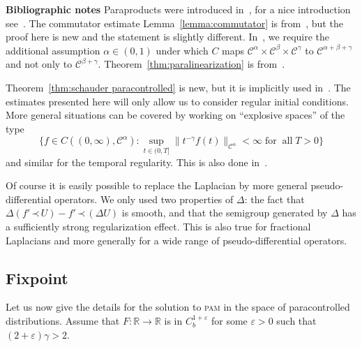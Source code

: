 \documentclass[a4paper,11pt]{article}
\newcommand{\tmname}[1]{\textsc{#1}}
\newcommand{\tmop}[1]{\ensuremath{\operatorname{#1}}}
\newcommand{\tmtextbf}[1]{{\bfseries{#1}}}
\newcommand{\CC}{\mathscr{C}}
\newcommand{\lpara}{\,\mathord{\prec}\,}
\begin{document}
\tmtextbf{Bibliographic notes} Paraproducts were introduced
in~{\cite{Bony1981}}, for a nice introduction see~{\cite{Bahouri2011}}. The
commutator estimate Lemma~\ref{lemma:commutator} is
from~{\cite{Gubinelli2012}}, but the proof here is new and the statement is
slightly different. In~{\cite{Gubinelli2012}}, we require the additional
assumption $\alpha \in (0, 1)$ under which $C$ maps $\CC^{\alpha} \times
\CC^{\beta} \times \CC^{\gamma}$ to $\CC^{\alpha + \beta + \gamma}$ and not
only to $\CC^{\beta + \gamma}$. Theorem~\ref{thm:paralinearization} is
from~{\cite{Gubinelli2012}}.

Theorem~\ref{thm:schauder paracontrolled} is new, but it is implicitly used
in~{\cite{Gubinelli2012}}. The estimates presented here will only allow us to
consider regular initial conditions. More general situations can be covered by
working on ``explosive spaces'' of the type
\[ \Big\{f \in C \left( (0, \infty), \CC^{\alpha} \right) : \sup_{t \in (0, T]} \|
   t^{- \gamma} f (t) \|_{\CC^{\alpha}} < \infty \tmop{for} \tmop{all} T > 0 \Big\}
\]
and similar for the temporal regularity. This is also done
in~{\cite{Gubinelli2012}}.

Of course it is easily possible to replace the Laplacian by more general
pseudo-differential operators. We only used two properties of $\Delta$: the
fact that $\Delta (f' \lpara U) - f' \lpara (\Delta U)$ is smooth, and that the
semigroup generated by $\Delta$ has a sufficiently strong regularization
effect. This is also true for fractional Laplacians and more generally for a
wide range of pseudo-differential operators.

\subsection{Fixpoint}\label{sec:fixpoint}

Let us now give the details for the solution to {\tmname{pam}} in the space of
paracontrolled distributions. Assume that $F : \mathbb{R} \rightarrow
\mathbb{R}$ is in $C^{1 + \varepsilon}_b$ for some $\varepsilon > 0$ such
that $(2 + \varepsilon) \gamma > 2$.
\end{document}
